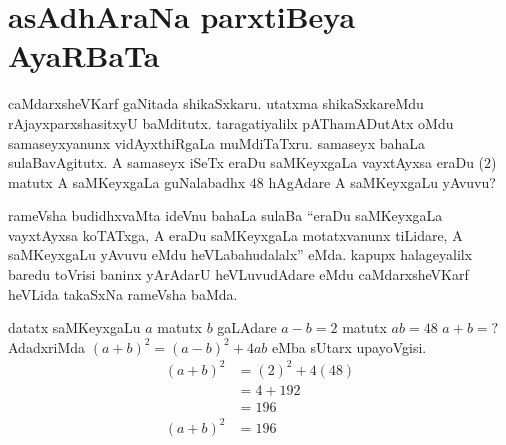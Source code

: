 \chapter{asAdhAraNa parxtiBeya AyaRBaTa}

caMdarxsheVKarf gaNitada shikaSxkaru. utatxma shikaSxkareMdu rAjayxparxshasitxyU baMditutx. taragatiyalilx pAThamADutAtx oMdu samaseyxyanunx vidAyxthiRgaLa muMdiTaTxru. samaseyx bahaLa sulaBavAgitutx. A samaseyx iSeTx eraDu saMKeyxgaLa vayxtAyxsa eraDu ($2$) matutx A saMKeyxgaLa guNalabadhx $48$ hAgAdare A saMKeyxgaLu yAvuvu?

rameVsha budidhxvaMta ideVnu bahaLa sulaBa ``eraDu saMKeyxgaLa vayxtAyxsa koTATxga, A eraDu saMKeyxgaLa motatxvanunx tiLidare, A saMKeyxgaLu yAvuvu eMdu heVLabahudalalx'' eMda. kapupx halageyalilx baredu toVrisi baninx yArAdarU heVLuvudAdare eMdu caMdarxsheVKarf heVLida takaSxNa rameVsha baMda.

datatx saMKeyxgaLu $a$ matutx $b$ gaLAdare $a-b=2$ matutx $ab = 48$ $a+b=?$
AdadxriMda $(a+b)^2 = (a-b)^2 + 4ab$ eMba sUtarx upayoVgisi.
\begin{align*}
  (a+b)^2 & = (2)^2 +4 (48)\\
  & = 4+192\\
  & = 196\\
  (a+b)^2 & = 196\\
\end{align*}

